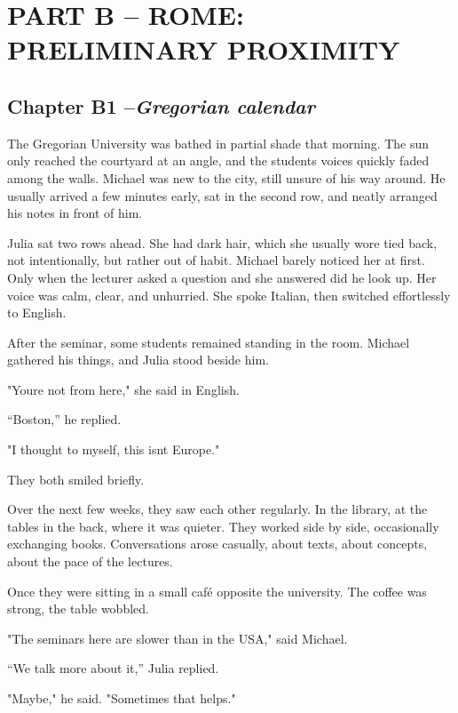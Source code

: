 \documentclass[
]{article}
\begin{document}
\section{PART B -- ROME: PRELIMINARY PROXIMITY}\label{part-b-rome-preliminary-proximity}

\subsection{\texorpdfstring{Chapter B1 --\emph{Gregorian calendar}}{Chapter B1 --Gregorian calendar}}\label{chapter-b1-gregorian-calendar}

The Gregorian University was bathed in partial shade that morning. The sun only reached the courtyard at an angle, and the students\textquotesingle{} voices quickly faded among the walls. Michael was new to the city, still unsure of his way around. He usually arrived a few minutes early, sat in the second row, and neatly arranged his notes in front of him.

Julia sat two rows ahead. She had dark hair, which she usually wore tied back, not intentionally, but rather out of habit. Michael barely noticed her at first. Only when the lecturer asked a question and she answered did he look up. Her voice was calm, clear, and unhurried. She spoke Italian, then switched effortlessly to English.

After the seminar, some students remained standing in the room. Michael gathered his things, and Julia stood beside him.

"You\textquotesingle re not from here," she said in English.

``Boston,'' he replied.

"I thought to myself, this isn\textquotesingle t Europe."

They both smiled briefly.

Over the next few weeks, they saw each other regularly. In the library, at the tables in the back, where it was quieter. They worked side by side, occasionally exchanging books. Conversations arose casually, about texts, about concepts, about the pace of the lectures.

Once they were sitting in a small café opposite the university. The coffee was strong, the table wobbled.

"The seminars here are slower than in the USA," said Michael.

``We talk more about it,'' Julia replied.

"Maybe," he said. "Sometimes that helps."
\end{document}
